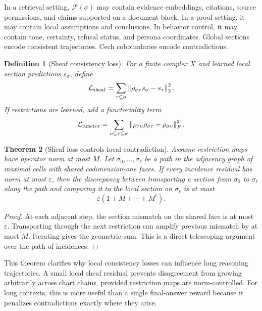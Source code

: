 \documentclass[11pt]{article}
\newtheorem{definition}{Definition}[section]
\newtheorem{theorem}[definition]{Theorem}
\newcommand{\calF}{\mathcal{F}}
\newcommand{\calL}{\mathcal{L}}
\newcommand{\norm}[1]{\left\lVert #1\right\rVert}
\newcommand{\eps}{\varepsilon}
\begin{document}
In a retrieval setting, \(\calF(\sigma)\) may contain evidence embeddings, citations, source permissions, and claims supported on a document block.  In a proof setting, it may contain local assumptions and conclusions.  In behavior control, it may contain tone, certainty, refusal status, and persona coordinates.  Global sections encode consistent trajectories.  Cech coboundaries encode contradictions.

\begin{definition}[Sheaf consistency loss]
For a finite complex \(X\) and learned local section predictions \(s_\sigma\), define
\begin{equation}
\calL_{\rm sheaf}=\sum_{\tau\subseteq\sigma}\norm{\rho_{\sigma\tau}s_\sigma-s_\tau}_2^2.
\end{equation}
If restrictions are learned, add a functoriality term
\begin{equation}
\calL_{\rm functor}=\sum_{\upsilon\subseteq\tau\subseteq\sigma}\norm{\rho_{\tau\upsilon}\rho_{\sigma\tau}-\rho_{\sigma\upsilon}}_F^2.
\end{equation}
\end{definition}

\begin{theorem}[Sheaf loss controls local contradiction]
Assume restriction maps have operator norm at most \(M\).  Let \(\sigma_0,\ldots,\sigma_\ell\) be a path in the adjacency graph of maximal cells with shared codimension-one faces.  If every incidence residual has norm at most \(\eps\), then the discrepancy between transporting a section from \(\sigma_0\) to \(\sigma_\ell\) along the path and comparing it to the local section on \(\sigma_\ell\) is at most
\begin{equation}
\eps(1+M+\cdots+M^\ell).
\end{equation}
\end{theorem}

\begin{proof}
At each adjacent step, the section mismatch on the shared face is at most \(\eps\).  Transporting through the next restriction can amplify previous mismatch by at most \(M\).  Iterating gives the geometric sum.  This is a direct telescoping argument over the path of incidences.
\end{proof}

This theorem clarifies why local consistency losses can influence long reasoning trajectories.  A small local sheaf residual prevents disagreement from growing arbitrarily across chart chains, provided restriction maps are norm-controlled.  For long contexts, this is more useful than a single final-answer reward because it penalizes contradictions exactly where they arise.
\end{document}
